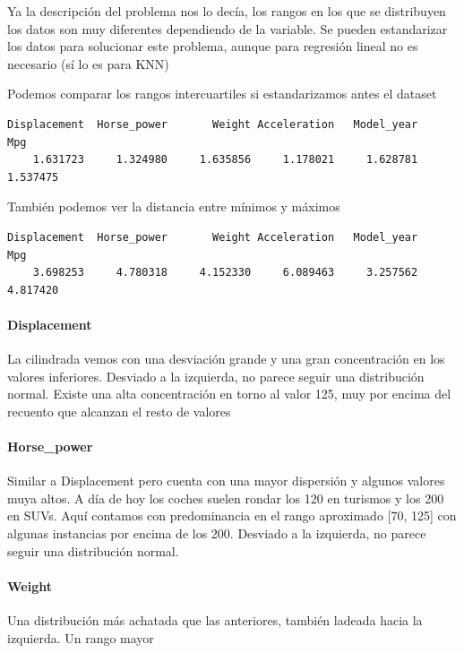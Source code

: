Ya la descripción del problema nos lo decía, los rangos en los que se distribuyen los datos son muy diferentes dependiendo de la variable. Se pueden estandarizar los datos para solucionar este problema, aunque para regresión lineal no es necesario (sí lo es para KNN)

Podemos comparar los rangos intercuartiles si estandarizamos antes el dataset

\begin{verbatim}
Displacement  Horse_power       Weight Acceleration   Model_year          Mpg 
    1.631723     1.324980     1.635856     1.178021     1.628781     1.537475 
\end{verbatim}

También podemos ver la distancia entre mínimos y máximos

\begin{verbatim}
Displacement  Horse_power       Weight Acceleration   Model_year          Mpg 
    3.698253     4.780318     4.152330     6.089463     3.257562     4.817420 
\end{verbatim}

\paragraph{Displacement}

La cilindrada vemos con una desviación grande y una gran concentración
en los valores inferiores. Desviado a la izquierda, no parece seguir una
distribución normal. Existe una alta concentración en torno al valor
125, muy por encima del recuento que alcanzan el resto de valores

\paragraph{Horse\_power}

Similar a Displacement pero cuenta con una mayor dispersión y algunos
valores muya altos. A día de hoy los coches suelen rondar los 120 en
turismos y los 200 en SUVs. Aquí contamos con predominancia en el rango
aproximado {[}70, 125{]} con algunas instancias por encima de los 200.
Desviado a la izquierda, no parece seguir una distribución normal.


\paragraph{Weight}

Una distribución más achatada que las anteriores, también ladeada hacia
la izquierda. Un rango mayor

